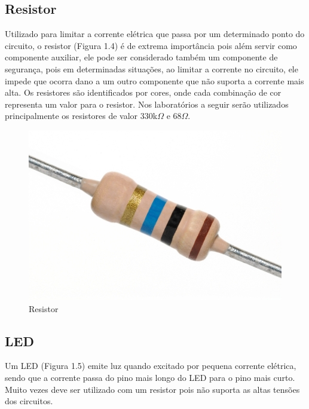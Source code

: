 \subsection{Resistor}
\label{subsec:1}
Utilizado para limitar a corrente elétrica que passa por um determinado ponto do circuito, o resistor (Figura 1.4) é de extrema importância pois além servir como componente auxiliar, ele pode ser considerado também um componente de segurança, pois em determinadas situações, ao limitar a corrente no circuito, ele impede que ocorra dano a um outro componente que não suporta a corrente mais alta. Os resistores são identificados por cores, onde cada combinação de cor representa um valor para o resistor. Nos laboratórios a seguir serão utilizados principalmente os resistores de valor 330k$\Omega$ e 68$\Omega$.

\begin{figure}[h]
\centering
\includegraphics[scale=1.5]{chapter1/resistor.jpg}
\caption{Resistor}
\label{fig:4}
\end{figure}

\subsection{LED}
\label{subsec:2}
Um LED (Figura 1.5) emite luz quando excitado por pequena corrente elétrica, sendo que a corrente passa do pino mais longo do LED para o pino mais curto. Muito vezes deve ser utilizado com um resistor pois não suporta as altas tensões dos circuitos.

